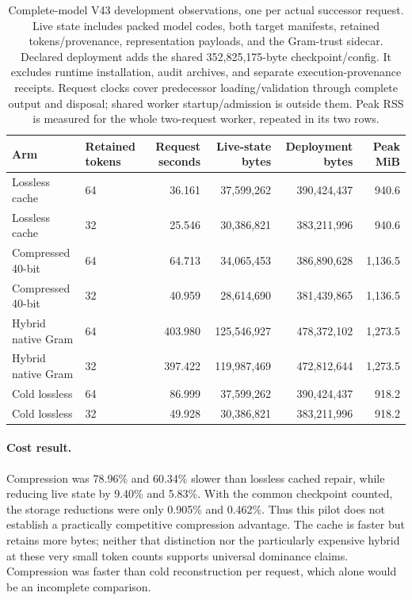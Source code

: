 \documentclass[10pt,twocolumn,letterpaper]{article}
\begin{document}
\begin{table}[t]
\centering
\small
\begin{tabular}{llrrrr}
\toprule
Arm & Retained tokens & Request seconds & Live-state bytes & Deployment bytes & Peak MiB\\
\midrule
Lossless cache &64&36.161&37,599,262&390,424,437&940.6\\
Lossless cache &32&25.546&30,386,821&383,211,996&940.6\\
Compressed 40-bit &64&64.713&34,065,453&386,890,628&1,136.5\\
Compressed 40-bit &32&40.959&28,614,690&381,439,865&1,136.5\\
Hybrid native Gram &64&403.980&125,546,927&478,372,102&1,273.5\\
Hybrid native Gram &32&397.422&119,987,469&472,812,644&1,273.5\\
Cold lossless &64&86.999&37,599,262&390,424,437&918.2\\
Cold lossless &32&49.928&30,386,821&383,211,996&918.2\\
\bottomrule
\end{tabular}
\caption{Complete-model V43 development observations, one per actual successor
request. Live state includes packed model codes, both target manifests, retained
tokens/provenance, representation payloads, and the Gram-trust sidecar. Declared
deployment adds the shared 352,825,175-byte checkpoint/config. It excludes runtime
installation, audit archives, and separate execution-provenance receipts. Request
clocks cover predecessor loading/validation through complete output and disposal;
shared worker startup/admission is outside them. Peak RSS is measured for the
whole two-request worker, repeated in its two rows.}
\label{tab:v43}
\end{table}

\paragraph{Cost result.}
Compression was 78.96\% and 60.34\% slower than lossless cached repair, while
reducing live state by 9.40\% and 5.83\%. With the common checkpoint counted, the
storage reductions were only 0.905\% and 0.462\%. Thus this pilot does not establish
a practically competitive compression advantage. The cache is faster but retains
more bytes; neither that distinction nor the particularly expensive hybrid at
these very small token counts supports universal dominance claims. Compression
was faster than cold reconstruction per request, which alone would be an
incomplete comparison.
\end{document}
